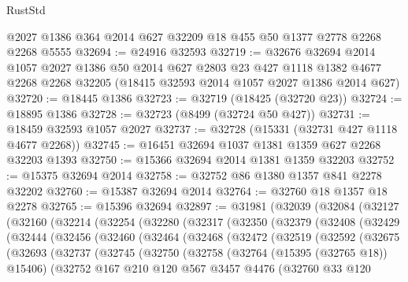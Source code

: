 \begin{lexlean}{RustStd}
\begin{coremodule}
    @2027
    @1386
    @364
    @2014
    @627
    @32209
    @18
    @455
    @50
    @1377
    @2778
    @2268
    @2268
    @5555
@32694 := @24916 @32593
@32719 := @32676
    @32694
    @2014
    @1057
    @2027
    @1386
    @50
    @2014
    @627
    @2803
    @23
    @427
    @1118
    @1382
    @4677
    @2268
    @2268
    @32205
    (@18415 @32593 @2014 @1057 @2027 @1386 @2014 @627)
@32720 := @18445 @1386
@32723 := @32719 (@18425 (@32720 @23))
@32724 := @18895 @1386
@32728 := @32723 (@8499 (@32724 @50 @427))
@32731 := @18459 @32593 @1057 @2027
@32737 := @32728 (@15331 (@32731 @427 @1118 @4677 @2268))
@32745 := @16451 @32694 @1037 @1381 @1359 @627 @2268 @32203 @1393
@32750 := @15366 @32694 @2014 @1381 @1359 @32203
@32752 := @15375 @32694 @2014
@32758 := @32752 @86 @1380 @1357 @841 @2278 @32202
@32760 := @15387 @32694 @2014
@32764 := @32760 @18 @1357 @18 @2278
@32765 := @15396 @32694
@32897 := @31981
    (@32039
      (@32084
        (@32127
          (@32160
            (@32214
              (@32254
                (@32280
                  (@32317
                    (@32350
                      (@32379
                        (@32408
                          (@32429
                            (@32444
                              (@32456
                                (@32460
                                  (@32464
                                    (@32468
                                      (@32472
                                        (@32519
                                          (@32592
                                            (@32675
                                              (@32693
                                                (@32737
                                                  (@32745
                                                    (@32750
                                                      (@32758
                                                        (@32764 (@15395 (@32765 @18)) @15406)
                                                        (@32752
                                                          @167
                                                          @210
                                                          @120
                                                          @567
                                                          @3457
                                                          @4476
                                                          (@32760
                                                            @33
                                                            @120

\end{coremodule}
\end{lexlean}
